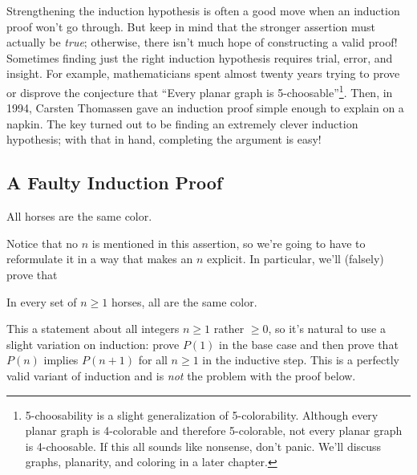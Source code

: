 Strengthening the induction hypothesis is often a good move when an
induction proof won't go through.  But keep in mind that the stronger
assertion must actually be \emph{true}; otherwise, there isn't much hope
of constructing a valid proof!  Sometimes finding just the right induction
hypothesis requires trial, error, and insight.  For example,
mathematicians spent almost twenty years trying to prove or disprove the
conjecture that ``Every planar graph is
5-choosable''\footnote{5-choosability is a slight generalization of
  5-colorability.  Although every planar graph is 4-colorable and
  therefore 5-colorable, not every planar graph is 4-choosable.  If this
  all sounds like nonsense, don't panic.  We'll discuss graphs, planarity,
  and coloring in a later chapter.}.  Then, in 1994, Carsten Thomassen
gave an induction proof simple enough to explain on a napkin.  The key
turned out to be finding an extremely clever induction hypothesis; with
that in hand, completing the argument is easy!


\subsection{A Faulty Induction Proof}

\begin{falsethm*}
All horses are the same color.
\end{falsethm*}

Notice that no $n$ is mentioned in this assertion, so we're going to have
to reformulate it in a way that makes an $n$ explicit.  In particular,
we'll (falsely) prove that

\begin{falsethm}\label{horses}
In every set of $n \geq 1$ horses, all are the same color.
\end{falsethm}

This a statement about all integers $n \geq 1$ rather $\geq 0$, so it's
natural to use a slight variation on induction: prove $P(1)$ in the base
case and then prove that $P(n)$ implies $P(n+1)$ for all $n \geq 1$ in the
inductive step.  This is a perfectly valid variant of induction and is
{\em not} the problem with the proof below.

